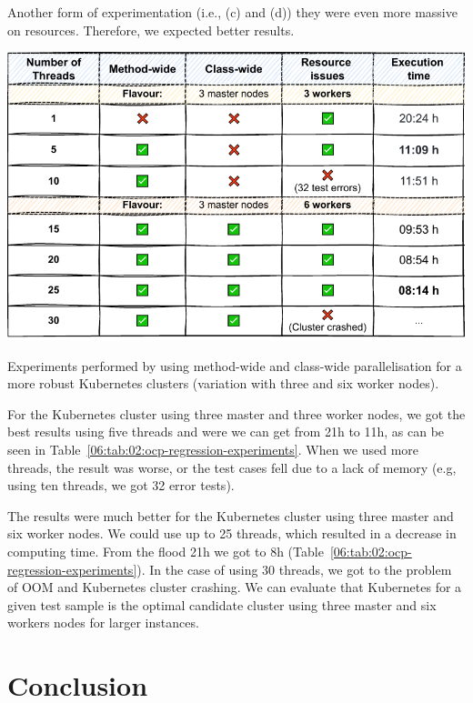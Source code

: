 Another form of experimentation (i.e., (c) and (d)) they were even more massive on resources.
Therefore, we expected better results.
\begin{table}[ht!]
    \centering
    \includegraphics[scale=0.8]{obrazky-figures/08-experiments/regression/06-exp-ocp-regression}
    \caption{Experiments performed by using method-wide and class-wide parallelisation for a more robust Kubernetes
    clusters (variation with three and six worker nodes).}
    \label{06:tab:02:ocp-regression-experiments}
\end{table}
For the Kubernetes cluster using three master and three worker nodes, we got the best results using five threads and were
we can get from 21h to 11h, as can be seen in Table~\ref{06:tab:02:ocp-regression-experiments}.
When we used more threads, the result was worse, or the test cases fell due to a lack of memory (e.g, using
ten threads, we got 32 error tests).

The results were much better for the Kubernetes cluster using three master and six worker nodes.
We could use up to 25 threads, which resulted in a decrease in computing time.
From the flood 21h we got to 8h (Table~\ref{06:tab:02:ocp-regression-experiments}).
In the case of using 30 threads, we got to the problem of OOM and Kubernetes cluster crashing.
We can evaluate that Kubernetes for a given test sample is the optimal candidate
cluster using three master and six workers nodes for larger instances.

\chapter{Conclusion}
\label{08:chapter:title}

